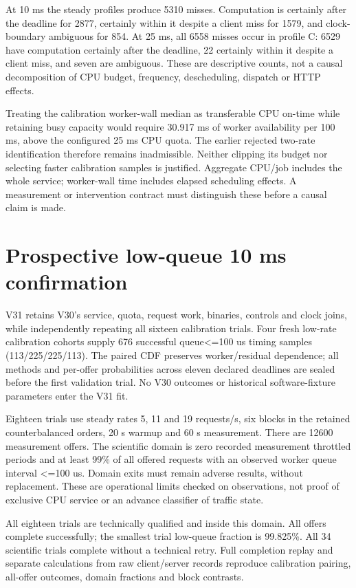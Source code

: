 \documentclass[11pt,a4paper]{article}
\begin{document}
At 10 ms the steady profiles produce 5310 misses. Computation is certainly
after the deadline for 2877, certainly within it despite a client miss for
1579, and clock-boundary ambiguous for 854. At 25 ms, all 6558 misses occur in
profile C: 6529 have computation certainly after the deadline, 22 certainly
within it despite a client miss, and seven are ambiguous. These are
descriptive counts, not a causal decomposition of CPU budget, frequency,
descheduling, dispatch or HTTP effects.

Treating the calibration worker-wall median as transferable CPU on-time while
retaining busy capacity would require 30.917 ms of worker availability per
100 ms, above the configured 25 ms CPU quota. The earlier rejected two-rate
identification therefore remains inadmissible. Neither clipping its budget nor
selecting faster calibration samples is justified. Aggregate CPU/job includes
the whole service; worker-wall time includes elapsed scheduling effects. A
measurement or intervention contract must distinguish these before a causal
claim is made.

\section{Prospective low-queue 10 ms confirmation}

V31 retains V30's service, quota, request work, binaries, controls and clock
joins, while independently repeating all sixteen calibration trials. Four
fresh low-rate calibration cohorts supply 676 successful queue<=100 us timing
samples (113/225/225/113). The paired CDF preserves worker/residual dependence;
all methods and per-offer probabilities across eleven declared deadlines are
sealed before the first validation trial. No V30 outcomes or historical
software-fixture parameters enter the V31 fit.

Eighteen trials use steady rates 5, 11 and 19 requests/s, six blocks in the
retained counterbalanced orders, 20 s warmup and 60 s measurement. There are
12600 measurement offers. The scientific domain is zero recorded measurement
throttled periods and at least 99\% of all offered requests with an observed
worker queue interval <=100 us. Domain exits must remain adverse results,
without replacement. These are operational limits checked on observations,
not proof of exclusive CPU service or an advance classifier of traffic state.

All eighteen trials are technically qualified and inside this domain. All
offers complete successfully; the smallest trial low-queue fraction is 99.825\%.
All 34 scientific trials complete without a technical retry. Full completion
replay and separate calculations from raw client/server records reproduce
calibration pairing, all-offer outcomes, domain fractions and block contrasts.
\end{document}
